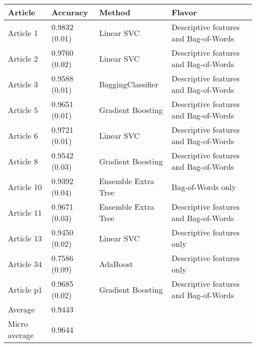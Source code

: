 \begin{tabular}{|l|l|l|l| }
\hline
Article & Accuracy & Method & Flavor \\ \hline
Article 1 & 0.9832 (0.01) & Linear SVC & Descriptive features and Bag-of-Words\\
Article 2 & 0.9760 (0.02) & Linear SVC & Descriptive features and Bag-of-Words\\
Article 3 & 0.9588 (0.01) & BaggingClassifier & Descriptive features and Bag-of-Words\\
Article 5 & 0.9651 (0.01) & Gradient Boosting & Descriptive features and Bag-of-Words\\
Article 6 & 0.9721 (0.01) & Linear SVC & Descriptive features and Bag-of-Words\\
Article 8 & 0.9542 (0.03) & Gradient Boosting & Descriptive features and Bag-of-Words\\
Article 10 & 0.9392 (0.04) & Ensemble Extra Tree & Bag-of-Words only\\
Article 11 & 0.9671 (0.03) & Ensemble Extra Tree & Descriptive features and Bag-of-Words\\
Article 13 & 0.9450 (0.02) & Linear SVC & Descriptive features only\\
Article 34 & 0.7586 (0.09) & AdaBoost & Descriptive features only\\
Article p1 & 0.9685 (0.02) & Gradient Boosting & Descriptive features and Bag-of-Words\\
Average & 0.9443 & & \\
Micro average & 0.9644 & & \\
\hline
\end{tabular}